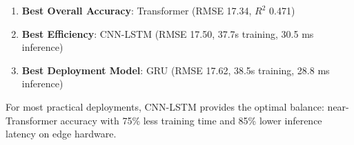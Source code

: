 \begin{enumerate}
    \item \textbf{Best Overall Accuracy}: Transformer (RMSE 17.34, $R^2$ 0.471)
    \item \textbf{Best Efficiency}: CNN-LSTM (RMSE 17.50, 37.7s training, 30.5 ms inference)
    \item \textbf{Best Deployment Model}: GRU (RMSE 17.62, 38.5s training, 28.8 ms inference)
\end{enumerate}

For most practical deployments, CNN-LSTM provides the optimal balance: near-Transformer accuracy with 75\% less training time and 85\% lower inference latency on edge hardware.
